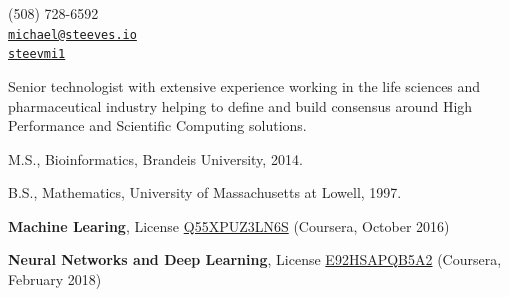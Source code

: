 \documentclass[11pt,article,oneside]{memoir}
\makeatletter
\def\myemail{michael@steeves.io}
\def\myphone{(508) 728-6592}
\def\mytwitter{@steevmi1}
\def\mygit{steevmi1}
\makeatother
\begin{document}
\begin{minipage}[t]{2.95in}

\end{minipage}
\hfill
\hfill
\begin{minipage}[t]{1.3in}
  \flushright \footnotesize  \addressblock \myphone \, \faPhone \\
  {\scriptsize  \texttt{\href{mailto:\myemail}{\myemail}} \, \faEnvelope} \\
  {\scriptsize  \texttt{\href{\mygit}{\mygit}} \, \faGithub}
\end{minipage}

\medskip

\reversemarginpar

\bigskip



\ind Senior technologist with extensive experience working in the life sciences and pharmaceutical industry helping to define and build consensus around High Performance and Scientific Computing solutions.

\bigskip



\ind M.S., Bioinformatics, Brandeis University, 2014.

\ind B.S., Mathematics, University of Massachusetts at Lowell, 1997.

\bigskip


\ind \textbf{Machine Learing}, License \href{https://www.coursera.org/account/accomplishments/verify/Q55XPUZ3LN6S}{Q55XPUZ3LN6S} (Coursera, October 2016)

\ind \textbf{Neural Networks and Deep Learning}, License \href{https://www.coursera.org/account/accomplishments/verify/E92HSAPQB5A2}{E92HSAPQB5A2} (Coursera, February 2018)
\end{document}
